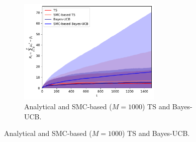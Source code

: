 \begin{figure}[!h]
	\centering
	\begin{subfigure}[b]{\textwidth}
		\centering
		\includegraphics[width=0.75\textwidth]{./fods_figs/static/bernoulli/A2/theta0.7_0.9_M1000_cumulative_regret}
		\caption{Analytical and SMC-based ($M=1000$) TS and Bayes-UCB.}
	\end{subfigure}
	

\end{figure}
